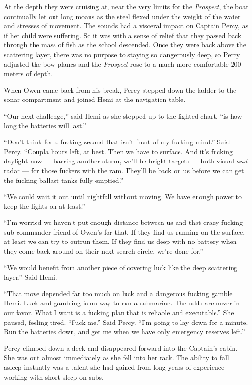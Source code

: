 \documentclass[]{scrbook}
\begin{document}
At the depth they were cruising at, near the very limits for the
\emph{Prospect}, the boat continually let out long moans as the steel
flexed under the weight of the water and stresses of movement. The
sounds had a visceral impact on Captain Percy, as if her child were
suffering. So it was with a sense of relief that they passed back
through the mass of fish as the school descended. Once they were back
above the scattering layer, there was no purpose to staying so
dangerously deep, so Percy adjusted the bow planes and the
\emph{Prospect} rose to a much more comfortable 200 meters of depth.

When Owen came back from his break, Percy stepped down the ladder to the
sonar compartment and joined Hemi at the navigation table.

``Our next challenge,'' said Hemi as she stepped up to the lighted
chart, ``is how long the batteries will last.''

``Don't think for a fucking second that isn't front of my fucking
mind.'' Said Percy. ``Coupla hours left, at best. Then we have to
surface. And it's fucking daylight now --- barring another storm, we'll
be bright targets --- both visual \emph{and} radar --- for those fuckers
with the ram. They'll be back on us before we can get the fucking
ballast tanks fully emptied.''

``We could wait it out until nightfall without moving. We have enough
power to keep the lights on at least.''

``I'm worried we haven't put enough distance between us and that crazy
fucking sub commander friend of Owen's for that. If they find us running
on the surface, at least we can try to outrun them. If they find us deep
with no battery when they come back around on their next search circle,
we're done for.''

``We would benefit from another piece of covering luck like the deep
scattering layer.'' Said Hemi.

``That move depended far too much on luck and a dangerous fucking gamble
Hemi. Luck and gambling is no way to run a submarine. The odds are never
in our favor. What I want is a fucking plan that is reliable and
executable.'' She paused, feeling tired. ``Fuck me.'' Said Percy. ``I'm
going to lay down for a minute. Run the batteries down, and get me when
we have only emergency reserves left.''

Percy climbed down a deck and disappeared forward into the Captain's
cabin. She was out almost immediately as she fell into her rack. The
ability to fall asleep instantly was a talent she had gained from long
years of experience working with short sleep on subs.
\end{document}
